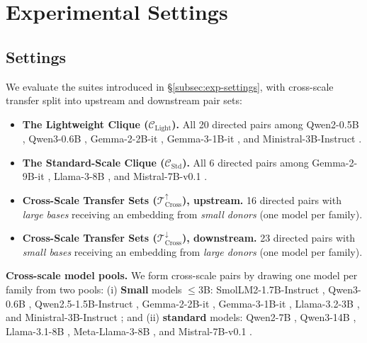 \section{Experimental Settings}
\label{app:exp_settings}

\subsection{Settings}
We evaluate the suites introduced in \S\ref{subsec:exp-settings}, with cross-scale transfer split into upstream and downstream pair sets:
\begin{itemize}[topsep=0pt,itemsep=1pt,parsep=0pt,partopsep=0pt,leftmargin=*]
  \item \textbf{The Lightweight Clique ($\mathcal{C}_{\text{Light}}$).} All 20 directed pairs among Qwen2-0.5B \citep{yang2024qwen2}, Qwen3-0.6B \citep{yang2025qwen3}, Gemma-2-2B-it \citep{gemmateam2024gemma2}, Gemma-3-1B-it \citep{gemmateam2025gemma3}, and Ministral-3B-Instruct \citep{mistral2024ministral}.
  \item \textbf{The Standard-Scale Clique ($\mathcal{C}_{\text{Std}}$).} All 6 directed pairs among Gemma-2-9B-it \citep{gemmateam2024gemma2}, Llama-3-8B \citep{dubey2024llama3}, and Mistral-7B-v0.1 \citep{jiang2023mistral7b}.
  \item \textbf{Cross-Scale Transfer Sets ($\mathcal{T}_{\text{Cross}}^{\uparrow}$), upstream.} 16 directed pairs with \emph{large bases} receiving an embedding from \emph{small donors} (one model per family).
  \item \textbf{Cross-Scale Transfer Sets ($\mathcal{T}_{\text{Cross}}^{\downarrow}$), downstream.} 23 directed pairs with \emph{small bases} receiving an embedding from \emph{large donors} (one model per family).
\end{itemize}

\noindent\textbf{Cross-scale model pools.}
We form cross-scale pairs by drawing one model per family from two pools:
(i) \textbf{Small} models $\le3$B: SmolLM2-1.7B-Instruct \citep{allal2025smollm2}, Qwen3-0.6B \citep{yang2025qwen3}, Qwen2.5-1.5B-Instruct \citep{yang2024qwen2.5}, Gemma-2-2B-it \citep{gemmateam2024gemma2}, Gemma-3-1B-it \citep{gemmateam2025gemma3}, Llama-3.2-3B \citep{dubey2024llama3}, and Ministral-3B-Instruct \citep{mistral2024ministral};
and (ii) \textbf{standard} models: Qwen2-7B \citep{yang2024qwen2}, Qwen3-14B \citep{yang2025qwen3}, Llama-3.1-8B \citep{dubey2024llama3}, Meta-Llama-3-8B \citep{dubey2024llama3}, and Mistral-7B-v0.1 \citep{jiang2023mistral7b}.

